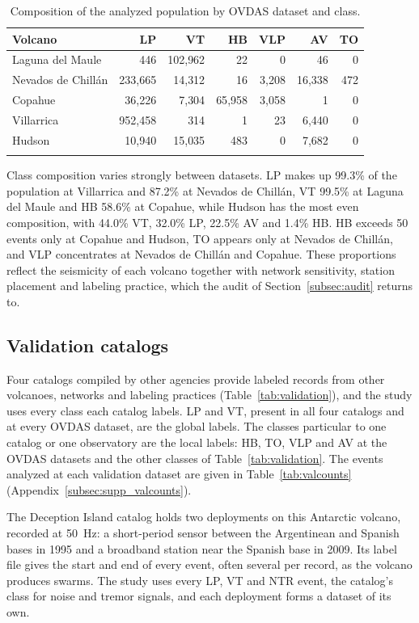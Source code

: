 \documentclass[pdflatex,sn-mathphys-num]{sn-jnl}
\begin{document}
\begin{table}[h]
\caption{Composition of the analyzed population by OVDAS dataset and
class.}\label{tab:counts}
\begin{tabular}{@{}lrrrrrr@{}}
\toprule
Volcano & LP & VT & HB & VLP & AV & TO \\
\midrule
Laguna del Maule
& 446 & 102{,}962 & 22 & 0 & 46 & 0 \\
Nevados de Chill\'an
& 233{,}665 & 14{,}312 & 16 & 3{,}208 & 16{,}338 & 472 \\
Copahue
& 36{,}226 & 7{,}304 & 65{,}958 & 3{,}058 & 1 & 0 \\
Villarrica
& 952{,}458 & 314 & 1 & 23 & 6{,}440 & 0 \\
Hudson
& 10{,}940 & 15{,}035 & 483 & 0 & 7{,}682 & 0 \\
\botrule
\end{tabular}
\end{table}

Class composition varies strongly between datasets. LP makes up 99.3\% of the
population at Villarrica and 87.2\% at Nevados de Chill\'an, VT 99.5\% at
Laguna del Maule and HB 58.6\% at Copahue, while Hudson has the most even
composition, with 44.0\% VT, 32.0\% LP, 22.5\% AV and 1.4\% HB. HB exceeds
50 events only at Copahue and Hudson, TO appears only at Nevados de
Chill\'an, and VLP concentrates at Nevados de Chill\'an and Copahue. These
proportions reflect the seismicity of each volcano together with network
sensitivity, station placement and labeling practice, which the audit of
Section~\ref{subsec:audit} returns to.

\subsection{Validation catalogs}\label{subsec:validation}

Four catalogs compiled by other agencies provide labeled records from other
volcanoes, networks and labeling practices (Table~\ref{tab:validation}), and
the study uses every class each catalog labels. LP and VT, present in all
four catalogs and at every OVDAS dataset, are the global labels. The classes
particular to one catalog or one observatory are the local labels: HB, TO,
VLP and AV at the OVDAS datasets and the other classes of
Table~\ref{tab:validation}. The events analyzed at each validation dataset are given in
Table~\ref{tab:valcounts} (Appendix~\ref{subsec:supp_valcounts}).

The Deception Island catalog
\cite{cortes_standardization_2019,cortes_moreno_vsr_2018} holds two deployments on this Antarctic volcano,
recorded at 50~Hz: a short-period sensor between the Argentinean and Spanish
bases in 1995 and a broadband station near the Spanish base in 2009. Its
label file gives the start and end of every event, often several per record,
as the volcano produces swarms. The study uses every LP, VT and NTR event,
the catalog's class for noise and tremor signals, and each deployment forms a
dataset of its own.
\end{document}
